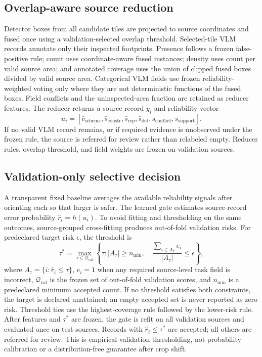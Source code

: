 \subsection{Overlap-aware source reduction}
Detector boxes from all candidate tiles are projected to source coordinates and fused once using a validation-selected overlap threshold. Selected-tile VLM records annotate only their inspected footprints. Presence follows a frozen false-positive rule; count uses coordinate-aware fused instances; density uses count per valid source area; and annotated coverage uses the union of clipped fused boxes divided by valid source area. Categorical VLM fields use frozen reliability-weighted voting only where they are not deterministic functions of the fused boxes. Field conflicts and the uninspected-area fraction are retained as reducer features. The reducer returns a source record $\tilde y_i$ and reliability vector
\begin{equation}
u_i=[\bar v_{\mathrm{schema}},\bar s_{\mathrm{constr}},
\bar s_{\mathrm{rep}},\bar s_{\mathrm{det}},s_{\mathrm{conflict}},
s_{\mathrm{support}}].
\label{eq:sourcefeatures}
\end{equation}
If no valid VLM record remains, or if required evidence is unobserved under the frozen rule, the source is referred for review rather than relabeled empty. Reducer rules, overlap threshold, and field weights are frozen on validation sources.

\subsection{Validation-only selective decision}
A transparent fixed baseline averages the available reliability signals after orienting each so that larger is safer. The learned gate estimates source-record error probability $\hat r_i=h(u_i)$. To avoid fitting and thresholding on the same outcomes, source-grouped cross-fitting produces out-of-fold validation risks. For predeclared target risk $\epsilon$, the threshold is
\begin{equation}
\tau^*=\max_{\tau\in\mathcal{Q}_{\mathrm{val}}}\left\{\tau:
|A_\tau|\geq n_{\min},\quad
\frac{\sum_{i\in A_\tau}e_i}{|A_\tau|}\leq\epsilon\right\},
\label{eq:threshold}
\end{equation}
where $A_\tau=\{i:\hat r_i\leq\tau\}$, $e_i=1$ when any required source-level task field is incorrect, $\mathcal{Q}_{\mathrm{val}}$ is the frozen set of out-of-fold validation scores, and $n_{\min}$ is a predeclared minimum accepted count. If no threshold satisfies both constraints, the target is declared unattained; an empty accepted set is never reported as zero risk. Threshold ties use the highest-coverage rule followed by the lower-risk rule. After features and $\tau^*$ are frozen, the gate is refit on all validation sources and evaluated once on test sources. Records with $\hat r_i\leq\tau^*$ are accepted; all others are referred for review. This is empirical validation thresholding, not probability calibration or a distribution-free guarantee after crop shift.

